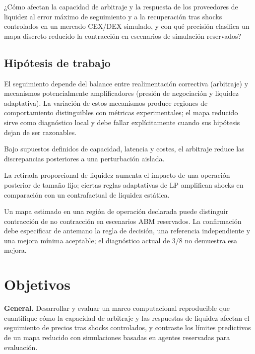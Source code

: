 ¿Cómo afectan la capacidad de arbitraje y la respuesta de los proveedores de liquidez
al error máximo de seguimiento y a la recuperación tras shocks controlados en un mercado
CEX/DEX simulado, y con qué precisión clasifica un mapa discreto reducido la contracción
en escenarios de simulación reservados?

\subsection{Hipótesis de trabajo}

El seguimiento depende del balance entre realimentación correctiva (arbitraje) y
mecanismos potencialmente amplificadores (presión de negociación y liquidez
adaptativa). La variación de estos mecanismos produce regiones de comportamiento
distinguibles con métricas experimentales; el mapa reducido sirve como diagnóstico
local y debe fallar explícitamente cuando sus hipótesis dejan de ser razonables.

\begin{description}[style=nextline]
  \item[H1a.] Bajo supuestos definidos de capacidad, latencia y costes, el arbitraje
    reduce las discrepancias posteriores a una perturbación aislada.
  \item[H1b.] La retirada proporcional de liquidez aumenta el impacto de una operación
    posterior de tamaño fijo; ciertas reglas adaptativas de LP amplifican shocks en
    comparación con un contrafactual de liquidez estática.
  \item[H1c.] Un mapa estimado en una región de operación declarada puede distinguir
    contracción de no contracción en escenarios ABM reservados. La confirmación debe
    especificar de antemano la regla de decisión, una referencia independiente y una
    mejora mínima aceptable; el diagnóstico actual de 3/8 no demuestra esa mejora.
\end{description}

\section{Objetivos}

\textbf{General.} Desarrollar y evaluar un marco computacional reproducible que cuantifique cómo la
capacidad de arbitraje y las respuestas de liquidez afectan el seguimiento de precios
tras shocks controlados, y contraste los límites predictivos de un mapa reducido con
simulaciones basadas en agentes reservadas para evaluación.

